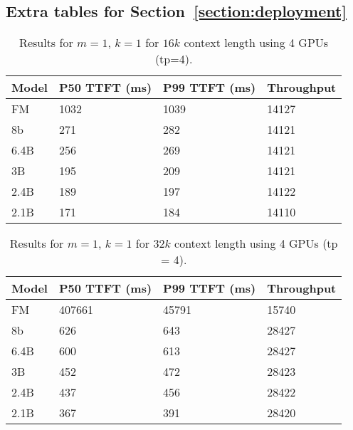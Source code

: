 \subsection{Extra tables for Section~\ref{section:deployment}}
\FloatBarrier
\label{subsec:Extra tables}
\begin{table}[htbp]
\begin{tabular}{llll}
\hline\hline
Model & P50 TTFT (ms) & P99 TTFT (ms) & Throughput \\ \hline\hline
FM    & 1032           & 1039           & 14127       \\
8b    & 271           & 282           & 14121      \\
6.4B  & 256           & 269           & 14121      \\
3B    & 195           & 209           & 14121      \\
2.4B  & 189           & 197           & 14122      \\
2.1B  & 171           & 184           & 14110      \\  \hline\hline
\end{tabular}
\caption{Results for $m=1$, $k=1$ for $16k$ context length using 4 GPUs (tp=4).}
\label{table:m1k1_16k}
\end{table}

\begin{table}[htbp]
\begin{tabular}{llll}
\hline\hline
Model & P50 TTFT (ms) & P99 TTFT (ms) & Throughput  \\ \hline\hline
FM    & 407661           & 45791           & 15740   \\
8b    & 626           & 643           & 28427       \\
6.4B  & 600           & 613           & 28427       \\
3B    & 452           & 472           & 28423       \\
2.4B  & 437           & 456           & 28422      \\ 
2.1B  & 367           & 391           & 28420       \\ \hline\hline

\end{tabular}
\caption{Results for $m=1$, $k=1$ for $32k$ context length using 4 GPUs (tp = 4).}
\label{table:m1k1_32k}
\end{table}

\newpage

